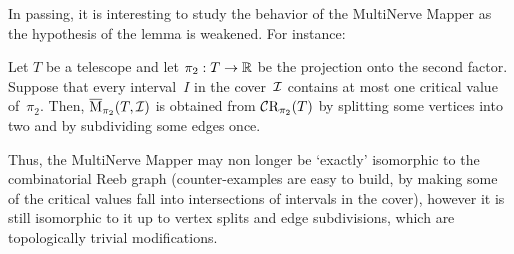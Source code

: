 In passing, it is interesting to study the behavior of the MultiNerve
Mapper as the hypothesis of the lemma is weakened. For instance:
%
\begin{lem}\label{lem:MMapper-Reeb-quasi-isom} 
Let $T$ be a telescope and let $\pi_2:T\to\mathbb{R}$ be the projection onto
the second factor.  Suppose that every interval~$I$ in the cover~$\mathcal{I}$
contains at most one critical value of~$\pi_2$. Then, $\overline{\mathrm{M}}_{\pi_2}(T,\mathcal{I})$
is obtained from $\mathcal{C}\mathrm{R}_{\pi_2}(T)$ by splitting some
vertices into two and by subdividing some edges once.
\end{lem}
%
Thus, the MultiNerve Mapper may non longer be `exactly' isomorphic to
the combinatorial Reeb graph (counter-examples are easy to build, by
making some of the critical values fall into intersections of
intervals in the cover), however it is still isomorphic to it up to
vertex splits and edge subdivisions, which are
topologically trivial modifications.  
%
